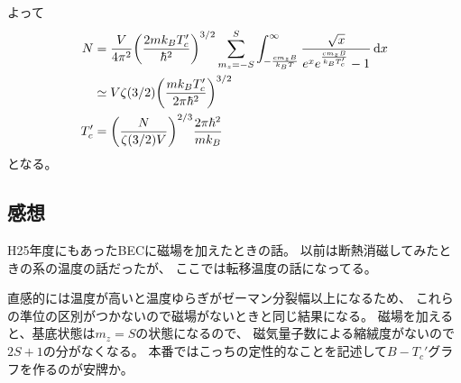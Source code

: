 \documentclass[../../sp_2021.tex]{subfiles}
\begin{document}
よって
\begin{equation}\begin{aligned}[b]
    N&= \frac{V}{4\pi^2}\qty(\frac{2mk_BT_c'}{\hbar^2})^{3/2}\sum_{m_z=-S}^{S}\int_{-\frac{cm_zB}{k_BT}}^{\infty} \frac{\sqrt{x}}{e^xe^{\frac{cm_zB}{k_BT_c'}}-1}\dd{x}\\
    &\simeq V\zeta(3/2)\qty(\frac{mk_BT_c'}{2\pi\hbar^2})^{3/2}\\
    T_c' &= \qty(\frac{N}{\zeta(3/2)V})^{2/3}\frac{2\pi\hbar^2}{mk_B}
\end{aligned}\end{equation}
となる。

\subsection*{感想}
H25年度にもあったBECに磁場を加えたときの話。
以前は断熱消磁してみたときの系の温度の話だったが、
ここでは転移温度の話になってる。

直感的には温度が高いと温度ゆらぎがゼーマン分裂幅以上になるため、
これらの準位の区別がつかないので磁場がないときと同じ結果になる。
磁場を加えると、基底状態は\(m_z=S\)の状態になるので、
磁気量子数による縮絨度がないので\(2S+1\)の分がなくなる。
本番ではこっちの定性的なことを記述して\(B-T_c'\)グラフを作るのが安牌か。
\end{document}
